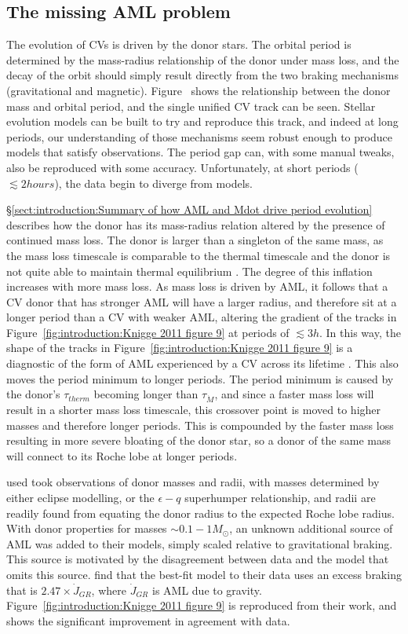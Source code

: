 \subsection{The missing AML problem}

The evolution of CVs is driven by the donor stars. The orbital period is determined by the mass-radius relationship of the donor under mass loss, and the decay of the orbit should simply result directly from the two braking mechanisms (gravitational and magnetic). Figure~ shows the relationship between the donor mass and orbital period, and the single unified CV track can be seen. Stellar evolution models can be built to try and reproduce this track, and indeed at long periods, our understanding of those mechanisms seem robust enough to produce models that satisfy observations. The period gap can, with some manual tweaks, also be reproduced with some accuracy. Unfortunately, at short periods ($\lesssim 2 hours$), the data begin to diverge from models. 

\S\ref{sect:introduction:Summary of how AML and Mdot drive period evolution} describes how the donor has its mass-radius relation altered by the presence of continued mass loss. The donor is larger than a singleton of the same mass, as the mass loss timescale is comparable to the thermal timescale and the donor is not quite able to maintain thermal equilibrium \citep{knigge11}. The degree of this inflation increases with more mass loss. As mass loss is driven by AML, it follows that a CV donor that has stronger AML will have a larger radius, and therefore sit at a longer period than a CV with weaker AML, altering the gradient of the tracks in Figure~\ref{fig:introduction:Knigge 2011 figure 9} at periods of $\lesssim 3h$. In this way, the shape of the tracks in Figure~\ref{fig:introduction:Knigge 2011 figure 9} is a diagnostic of the form of AML experienced by a CV across its lifetime \citep{knigge11}.
This also moves the period minimum to longer periods. The period minimum is caused by the donor's $\tau_{therm}$ becoming longer than $\tau_{\dot M}$, and since a faster mass loss will result in a shorter mass loss timescale, this crossover point is moved to higher masses and therefore longer periods. This is compounded by the faster mass loss resulting in more severe bloating of the donor star, so a donor of the same mass will connect to its Roche lobe at longer periods. 

\citet{knigge11} used took observations of donor masses and radii, with masses determined by either eclipse modelling, or the $\epsilon - q$ superhumper relationship, and radii are readily found from equating the donor radius to the expected Roche lobe radius. 
With donor properties for masses $\sim 0.1 - 1 M_\odot$, an unknown additional source of AML was added to their models, simply scaled relative to gravitational braking. This source is motivated by the disagreement between data and the model that omits this source. \citet{knigge11} find that the best-fit model to their data uses an excess braking that is $2.47 \times \dot J_{GR}$, where $\dot J_{GR}$ is AML due to gravity. Figure~\ref{fig:introduction:Knigge 2011 figure 9} is reproduced from their work, and shows the significant improvement in agreement with data.

